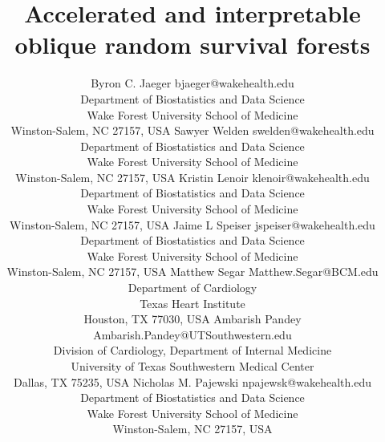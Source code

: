 \documentclass[twoside,11pt]{article}\usepackage[]{graphicx}\usepackage[]{xcolor}
\begin{document}
\title{Accelerated and interpretable oblique random survival forests}

\author{\name Byron C. Jaeger \email bjaeger@wakehealth.edu \\
       \addr Department of Biostatistics and Data Science\\
       Wake Forest University School of Medicine\\
       Winston-Salem, NC 27157, USA
       \AND
       \name Sawyer Welden \email swelden@wakehealth.edu \\
       \addr Department of Biostatistics and Data Science\\
       Wake Forest University School of Medicine\\
       Winston-Salem, NC 27157, USA
       \AND
       \name Kristin Lenoir \email klenoir@wakehealth.edu \\
       \addr Department of Biostatistics and Data Science\\
       Wake Forest University School of Medicine\\
       Winston-Salem, NC 27157, USA
       \AND
       \name Jaime L Speiser \email jspeiser@wakehealth.edu \\
       \addr Department of Biostatistics and Data Science\\
       Wake Forest University School of Medicine\\
       Winston-Salem, NC 27157, USA
       \AND
       \name Matthew Segar \email Matthew.Segar@BCM.edu \\
       \addr Department of Cardiology \\
       Texas Heart Institute \\
       Houston, TX 77030, USA
       \AND
       \name Ambarish Pandey \email Ambarish.Pandey@UTSouthwestern.edu \\
       \addr Division of Cardiology, Department of Internal Medicine \\
       University of Texas Southwestern Medical Center \\
       Dallas, TX 75235, USA
       \AND
       \name Nicholas M. Pajewski \email npajewsk@wakehealth.edu \\
       \addr Department of Biostatistics and Data Science\\
       Wake Forest University School of Medicine\\
       Winston-Salem, NC 27157, USA}


\maketitle
\end{document}
